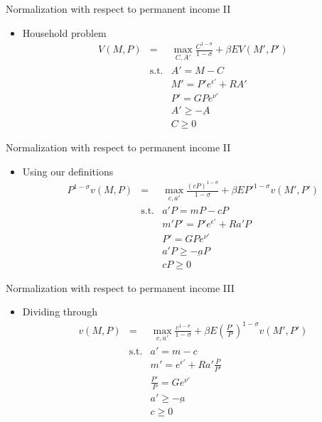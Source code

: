 \documentclass[9pt]{beamer}
\newcommand{\bit}{\begin{itemize}}
\newcommand{\eit}{\end{itemize}}
\begin{document}
\begin{frame}{Normalization with respect to permanent income II}

\bit
\setlength\itemsep{1.5em}

\item Household problem
\begin{eqnarray}
V(M, P) &=& \max_{C, A'} \frac{C^{1-\sigma}}{1-\sigma} + \beta E V(M', P') \nonumber \\
&\text{s.t.}& A'=M-C \nonumber \\
&& M' = P'e^{\epsilon'} + RA' \nonumber \\
&& P' = GPe^{\nu'} \nonumber \\
&& A'\geq -\underbar A \nonumber \\
&& C\geq 0 \nonumber
\end{eqnarray}

\eit

\end{frame}

\begin{frame}{Normalization with respect to permanent income II}

\bit
\setlength\itemsep{1em}

\item Using our definitions
\begin{eqnarray}
P^{1-\sigma}v(M, P) &=& \max_{c, a'} \frac{(cP)^{1-\sigma}}{1-\sigma} + \beta E P'^{1-\sigma} v(M', P') \nonumber \\
&\text{s.t.}& a'P = mP - cP \nonumber \\
&& m'P' = P'e^{\epsilon'} + Ra'P \nonumber \\
&& P' = GPe^{\nu'} \nonumber \\
&& a'P \geq -\underbar a P \nonumber \\
&& c P \geq 0 \nonumber
\end{eqnarray}

\eit

\end{frame}

\begin{frame}{Normalization with respect to permanent income III}

\bit
\setlength\itemsep{0.5em}

\item Dividing through
\begin{eqnarray}
v(M, P) &=& \max_{c, a'} \frac{c^{1-\sigma}}{1-\sigma} + \beta E \left(\frac{P'}{P}\right)^{1-\sigma} v(M', P') \nonumber \\
&\text{s.t.}& a' = m - c \nonumber \\
&& m' = e^{\epsilon'} + Ra'\frac{P}{P'} \nonumber \\
&& \frac{P'}{P} = Ge^{\nu'} \nonumber \\
&& a' \geq -\underbar a \nonumber \\
&& c \geq 0 \nonumber
\end{eqnarray}

\eit

\end{frame}
\end{document}
